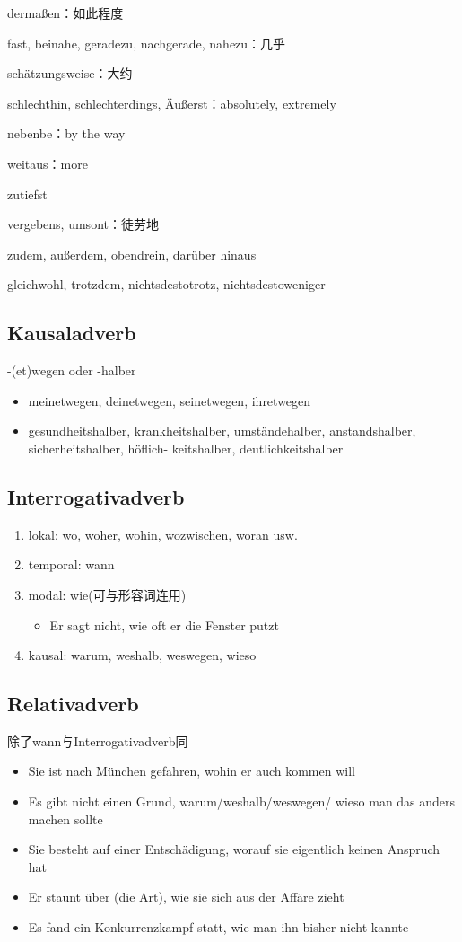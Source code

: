 \documentclass[UTF8]{report}
\begin{document}
dermaßen：如此程度

fast, beinahe, geradezu, nachgerade, nahezu：几乎

schätzungsweise：大约

schlechthin, schlechterdings, Äußerst：absolutely, extremely

nebenbe：by the way

weitaus：more

zutiefst

vergebens, umsont：徒劳地

zudem, außerdem, obendrein, darüber hinaus

gleichwohl, trotzdem, nichtsdestotrotz, nichtsdestoweniger

\subsection{Kausaladverb}
-(et)wegen oder -halber
\begin{itemize}
    \item meinetwegen, deinetwegen, seinetwegen, ihretwegen
    \item gesundheitshalber, krankheitshalber, umständehalber, anstandshalber, sicherheitshalber, höflich- keitshalber, deutlichkeitshalber
\end{itemize}

\subsection{Interrogativadverb}
\begin{enumerate}
    \item lokal: wo, woher, wohin, wozwischen, woran usw.
    \item temporal: wann
    \item modal: wie(可与形容词连用)
    \begin{itemize}
        \item Er sagt nicht, wie oft er die Fenster putzt
    \end{itemize}
    \item kausal: warum, weshalb, weswegen, wieso
\end{enumerate}

\subsection{Relativadverb}
除了wann与Interrogativadverb同
\begin{itemize}
    \item Sie ist nach München gefahren, wohin er auch kommen will
    \item Es gibt nicht einen Grund, warum/weshalb/weswegen/ wieso man das anders machen sollte
    \item Sie besteht auf einer Entschädigung, worauf sie eigentlich keinen Anspruch hat
    \item Er staunt über (die Art), wie sie sich aus der Affäre zieht
    \item Es fand ein Konkurrenzkampf statt, wie man ihn bisher nicht kannte
\end{itemize}
\end{document}
